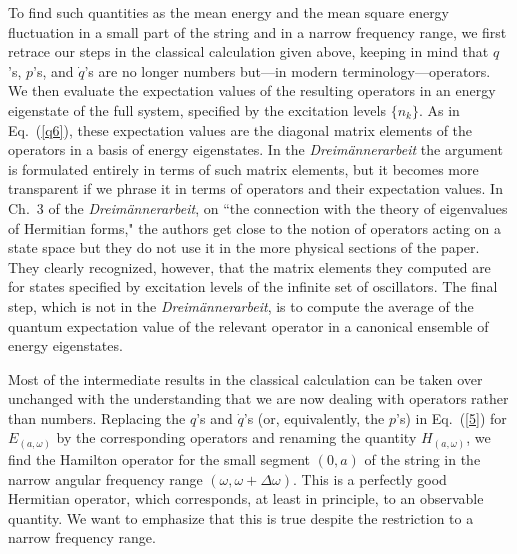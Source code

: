 \documentclass{elsart}
\begin{document}
To find such quantities as the mean energy and the mean square energy fluctuation in a small part of the string and in a narrow frequency range, we first retrace our steps in the classical calculation given above, keeping in mind that $q$'s, $p$'s, and $\dot{q}$'s are no longer numbers but---in modern terminology---operators. We then evaluate the expectation values of the resulting operators in an energy eigenstate of the full system, specified by the excitation levels $\{n_k\}$. As in Eq.\ (\ref{q6}), these expectation values are the diagonal matrix elements of the operators  in a basis of energy eigenstates. In the {\it Dreim\"annerarbeit}  the argument is formulated entirely in terms of such matrix elements, but  it becomes more transparent if we phrase it in terms of operators and their expectation values. In Ch.\ 3 of the {\it Dreim\"annerarbeit}, on ``the connection with the theory of eigenvalues of Hermitian forms,"  the authors get close to the notion of operators acting on a state space but they do not use it in the more physical sections of the paper. They clearly recognized, however, that the matrix elements they computed are for states specified by excitation levels of the infinite set of  oscillators. The final step, which is not in the {\it Dreim\"annerarbeit}, is to compute the average of the quantum expectation value of the relevant operator in a canonical ensemble of energy eigenstates.

Most of the intermediate results in the classical calculation can be taken over unchanged with the understanding that we are now dealing with operators rather than numbers. Replacing the $q$'s and $\dot{q}$'s (or, equivalently, the $p$'s) in Eq.\ (\ref{5}) for $E_{(a, \omega)}$ by the corresponding operators and renaming the quantity  $H_{(a, \omega)}$, we find the Hamilton operator for the small segment $(0, a)$ of the string in the narrow angular frequency range $(\omega, \omega + \Delta \omega)$. This is a perfectly good Hermitian operator, which corresponds, at least in principle, to an observable quantity. We want to emphasize that this is true despite the restriction to a narrow frequency range. 
\end{document}
